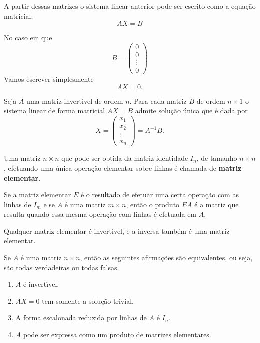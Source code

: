 A partir dessas matrizes o sistema linear anterior pode ser escrito como a equa\c{c}\~ao matricial:
\[
    AX = B
\]

No caso em que
\[
    B = \begin{pmatrix}
        0\\0\\\vdots\\0
    \end{pmatrix}
\]
Vamos escrever simplesmente
\[
    AX = 0.
\]

\begin{teorema}
    Seja $A$ uma matriz invert{\'\i}vel de ordem $n$. Para cada matriz $B$ de ordem $n\times 1$ o sistema linear de forma matricial
    $AX = B$ admite solu\c{c}\~ao \'unica que \'e dada por
    \[
        X = \begin{pmatrix}
            x_1 \\ x_2 \\ \vdots \\ x_n
        \end{pmatrix} = A^{-1}B.
    \]
\end{teorema}

\begin{definicao}
    Uma matriz $n\times n$ que pode ser obtida da matriz identidade $I_n$, de tamanho $n\times n$, efetuando uma 
    \'unica opera\c{c}\~ao elementar sobre linhas \'e chamada de \textbf{matriz elementar}.
\end{definicao}

\begin{teorema}
    Se a matriz elementar $E$ \'e o resultado de efetuar uma certa opera\c{c}\~ao com as linhas de $I_m$ e se $A$ \'e uma matriz 
    $m \times n$, ent\~ao o produto $EA$ \'e a matriz que resulta quando essa mesma opera\c{c}\~ao com linhas \'e efetuada em $A$.
\end{teorema}

\begin{teorema}
    Qualquer matriz elementar \'e invert{\'\i}vel, e a inversa tamb\'em \'e uma matriz elementar.
\end{teorema}

\begin{teorema}
    Se $A$ \'e uma matriz $n \times n$, ent\~ao as seguintes afirma\c{c}\~oes s\~ao equivalentes, ou seja, s\~ao todas verdadeiras  
    ou todas falsas.
    \begin{enumerate}[label={\roman*})]
        \item $A$ \'e invert{\'\i}vel.
        
        \item $AX = 0$ tem somente a solu\c{c}\~ao trivial.

        \item A forma escalonada reduzida por linhas de $A$ \'e $I_n$.

        \item $A$ pode ser expressa como um produto de matrizes elementares.
    \end{enumerate}
\end{teorema}

